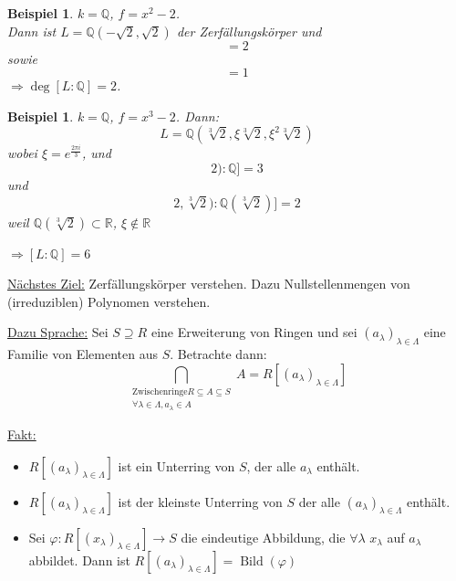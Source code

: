 \documentclass[a4paper,12pt,numbers=noenddot,parskip=full]{scrartcl}
\newcommand{\setQ}{\mathbb{Q}}
\newcommand{\setR}{\mathbb{R}}
\newcommand{\heading}{\underline}
\theoremstyle{dotless}
\newtheorem{example}[theorem]{Beispiel}
\theoremstyle{remark}
\begin{document}
	\begin{example}
		$k = \setQ$, $f = x^2 - 2$. \\Dann ist
		$
			L = \setQ(- \sqrt{2}, \sqrt{2})
		$
		der Zerfällungskörper und
		\begin{equation*}
			[\setQ(\sqrt{2}) : \setQ] = 2
		\end{equation*}
		sowie
		\begin{equation*}
			[\setQ(\sqrt{2}, - \sqrt{2}) : \setQ(\sqrt{2})] = 1
		\end{equation*}
		$\Rightarrow \deg[L : \setQ] = 2$.
	\end{example}

	\begin{example}
		$k = \setQ$, $f = x^3 - 2$. Dann:
		\begin{equation*}
			L = \setQ(\sqrt[3]{2}, \xi \sqrt[3]{2}, \xi^2 \sqrt[3]{2})
		\end{equation*}
		wobei $\xi = e^{\frac{2 \pi i}{3}}$, und
		\begin{equation*}
			[\setQ(\sqrt[3]{2}) : \setQ] = 3
		\end{equation*}
		und
		\begin{equation*}
			[\setQ(\xi \cdot \sqrt[3]{2}, \sqrt[3]{2}) : \setQ(\sqrt[3]{2})] = 2
		\end{equation*}
		weil $\setQ(\sqrt[3]{2}) \subset \setR$, $\xi \notin \setR$
		
		$\Rightarrow [L : \setQ] = 6$
	\end{example}

	\heading{Nächstes Ziel:} Zerfällungskörper verstehen. Dazu Nullstellenmengen von (irreduziblen) Polynomen verstehen.
	
	\heading{Dazu Sprache:} Sei $S \supseteq R$ eine Erweiterung von Ringen und sei $(a_\lambda)_{\lambda \in \Lambda}$ eine Familie von Elementen aus $S$. Betrachte dann:
	\begin{equation*}
		\bigcap_{\substack{\text{Zwischenringe} R \subseteq A \subseteq S \\ \forall \lambda \in \Lambda, a_\lambda \in A}} A = R[(a_\lambda)_{\lambda \in \Lambda}]
	\end{equation*}
	
	\heading{Fakt:}
	\begin{itemize}
		\item $R[(a_\lambda)_{\lambda \in \Lambda}]$ ist ein Unterring von $S$, der alle $a_\lambda$ enthält.
		\item $R[(a_\lambda)_{\lambda \in \Lambda}]$ ist der kleinste Unterring von $S$ der alle $(a_\lambda)_{\lambda \in \Lambda}$ enthält.
		\item Sei $\varphi: R[(x_\lambda)_{\lambda \in \Lambda}] \to S$ die eindeutige Abbildung, die $\forall \lambda$ $x_\lambda$ auf $a_\lambda$ abbildet. Dann ist $R[(a_\lambda)_{\lambda \in \Lambda}] = \operatorname{Bild}(\varphi)$
	\end{itemize}
\end{document}
